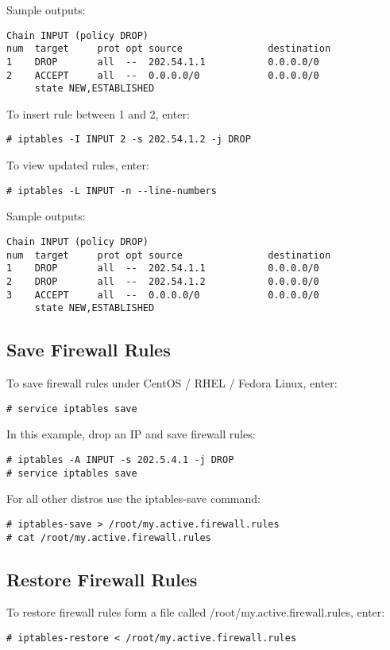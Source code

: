 \documentclass[dvipdfm]{book}
\begin{document}
Sample outputs:
\begin{verbatim}
Chain INPUT (policy DROP)
num  target     prot opt source               destination
1    DROP       all  --  202.54.1.1           0.0.0.0/0
2    ACCEPT     all  --  0.0.0.0/0            0.0.0.0/0      
     state NEW,ESTABLISHED
\end{verbatim}

To insert rule between 1 and 2, enter:
\begin{verbatim}
# iptables -I INPUT 2 -s 202.54.1.2 -j DROP
\end{verbatim}

To view updated rules, enter:
\begin{verbatim}
# iptables -L INPUT -n --line-numbers
\end{verbatim}

Sample outputs:
\begin{verbatim}
Chain INPUT (policy DROP)
num  target     prot opt source               destination
1    DROP       all  --  202.54.1.1           0.0.0.0/0
2    DROP       all  --  202.54.1.2           0.0.0.0/0
3    ACCEPT     all  --  0.0.0.0/0            0.0.0.0/0      
     state NEW,ESTABLISHED
\end{verbatim}

\subsection{Save Firewall Rules}

To save firewall rules under CentOS / RHEL / Fedora Linux, enter:
\begin{verbatim}
# service iptables save
\end{verbatim}

In this example, drop an IP and save firewall rules:
\begin{verbatim}
# iptables -A INPUT -s 202.5.4.1 -j DROP
# service iptables save
\end{verbatim}

For all other distros use the iptables-save command:
\begin{verbatim}
# iptables-save > /root/my.active.firewall.rules
# cat /root/my.active.firewall.rules
\end{verbatim}

\subsection{Restore Firewall Rules}

To restore firewall rules form a file called 
/root/my.active.firewall.rules, enter:
\begin{verbatim}
# iptables-restore < /root/my.active.firewall.rules
\end{verbatim}
\end{document}
